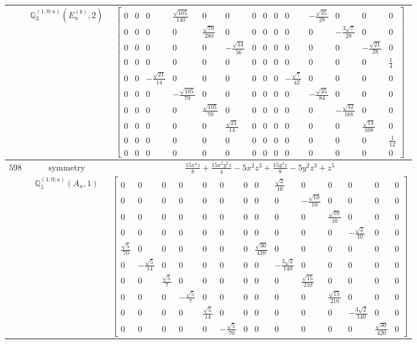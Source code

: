 \documentclass[fleqn,8pt,landscape]{jsarticle}
\begin{document}
\begin{longtable}{ccc}
$  $ & $ \mathbb{Q}_{3}^{(1,0;a)}(E_{u}^{(b)},2) $ & $ \begin{bmatrix} 0 & 0 & 0 & \frac{\sqrt{105}}{140} & 0 & 0 & 0 & 0 & 0 & 0 & - \frac{\sqrt{35}}{28} & 0 & 0 & 0 \\ 0 & 0 & 0 & 0 & \frac{\sqrt{70}}{280} & 0 & 0 & 0 & 0 & 0 & 0 & - \frac{3 \sqrt{7}}{28} & 0 & 0 \\ 0 & 0 & 0 & 0 & 0 & - \frac{\sqrt{14}}{56} & 0 & 0 & 0 & 0 & 0 & 0 & - \frac{\sqrt{21}}{28} & 0 \\ 0 & 0 & 0 & 0 & 0 & 0 & 0 & 0 & 0 & 0 & 0 & 0 & 0 & \frac{1}{4} \\ 0 & 0 & - \frac{\sqrt{21}}{14} & 0 & 0 & 0 & 0 & 0 & 0 & - \frac{\sqrt{7}}{42} & 0 & 0 & 0 & 0 \\ 0 & 0 & 0 & - \frac{\sqrt{105}}{70} & 0 & 0 & 0 & 0 & 0 & 0 & - \frac{\sqrt{35}}{84} & 0 & 0 & 0 \\ 0 & 0 & 0 & 0 & \frac{\sqrt{105}}{70} & 0 & 0 & 0 & 0 & 0 & 0 & - \frac{\sqrt{42}}{168} & 0 & 0 \\ 0 & 0 & 0 & 0 & 0 & \frac{\sqrt{21}}{14} & 0 & 0 & 0 & 0 & 0 & 0 & \frac{\sqrt{14}}{168} & 0 \\ 0 & 0 & 0 & 0 & 0 & 0 & 0 & 0 & 0 & 0 & 0 & 0 & 0 & \frac{1}{12} \\ 0 & 0 & 0 & 0 & 0 & 0 & 0 & 0 & 0 & 0 & 0 & 0 & 0 & 0 \end{bmatrix} $ \\ \hline
$ 598 $ & $ \text{symmetry} $ & $ \frac{15 x^{4} z}{8} + \frac{15 x^{2} y^{2} z}{4} - 5 x^{2} z^{3} + \frac{15 y^{4} z}{8} - 5 y^{2} z^{3} + z^{5} $ \\
$  $ & $ \mathbb{Q}_{5}^{(1,0;a)}(A_{u},1) $ & $ \begin{bmatrix} 0 & 0 & 0 & 0 & 0 & 0 & 0 & 0 & \frac{\sqrt{2}}{10} & 0 & 0 & 0 & 0 & 0 \\ 0 & 0 & 0 & 0 & 0 & 0 & 0 & 0 & 0 & - \frac{\sqrt{10}}{10} & 0 & 0 & 0 & 0 \\ 0 & 0 & 0 & 0 & 0 & 0 & 0 & 0 & 0 & 0 & \frac{\sqrt{10}}{10} & 0 & 0 & 0 \\ 0 & 0 & 0 & 0 & 0 & 0 & 0 & 0 & 0 & 0 & 0 & - \frac{\sqrt{2}}{10} & 0 & 0 \\ \frac{\sqrt{5}}{70} & 0 & 0 & 0 & 0 & 0 & 0 & \frac{\sqrt{30}}{420} & 0 & 0 & 0 & 0 & 0 & 0 \\ 0 & - \frac{\sqrt{5}}{14} & 0 & 0 & 0 & 0 & 0 & 0 & - \frac{3 \sqrt{2}}{140} & 0 & 0 & 0 & 0 & 0 \\ 0 & 0 & \frac{\sqrt{5}}{7} & 0 & 0 & 0 & 0 & 0 & 0 & \frac{\sqrt{15}}{210} & 0 & 0 & 0 & 0 \\ 0 & 0 & 0 & - \frac{\sqrt{5}}{7} & 0 & 0 & 0 & 0 & 0 & 0 & \frac{\sqrt{15}}{210} & 0 & 0 & 0 \\ 0 & 0 & 0 & 0 & \frac{\sqrt{5}}{14} & 0 & 0 & 0 & 0 & 0 & 0 & - \frac{3 \sqrt{2}}{140} & 0 & 0 \\ 0 & 0 & 0 & 0 & 0 & - \frac{\sqrt{5}}{70} & 0 & 0 & 0 & 0 & 0 & 0 & \frac{\sqrt{30}}{420} & 0 \end{bmatrix} $ \\ \hline

\end{longtable}
\end{document}
